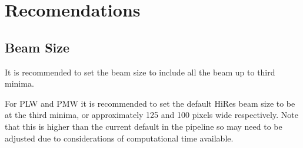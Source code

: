 \documentclass[a4paper]{article}
\numberwithin{equation}{section}
\begin{document}
\section{Recomendations}

\subsection{Beam Size}

It is recommended to set the beam size to include all the beam up to third minima.

For PLW and PMW it is recommended to set the default HiRes beam size to be at the third minima, or approximately 125 and 100 pixels wide respectively. Note that this is higher than the current default in the pipeline so may need to be adjusted due to considerations of computational time available.


\end{document}

